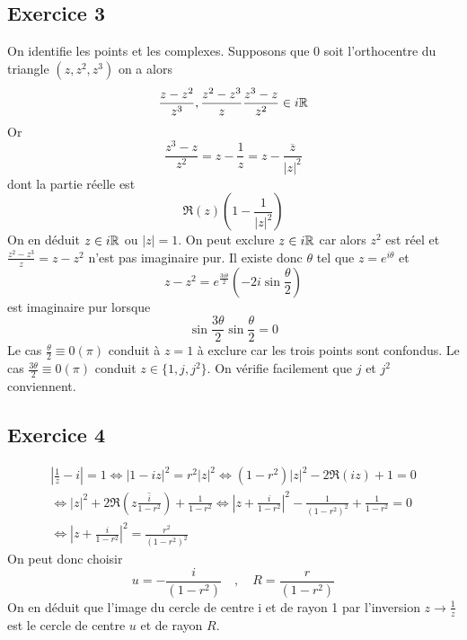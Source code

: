 \subsection*{Exercice 3} On identifie les points et les complexes. Supposons que $0$ soit l'orthocentre du triangle $(z,z^{2},z^{3})$ on a alors
\begin{displaymath}
\frac{z-z^{2}}{z^{3}},\frac{z^{2}-z^{3}}{z}\frac{z^{3}-z}{z^{2}}\in i\mathbb{R}
\end{displaymath}
Or
\begin{displaymath}
\frac{z^{3}-z}{z^{2}}=z-\frac{1}{z}=z-\frac{\overline{z}}{|z|^{2}}
\end{displaymath}
dont la partie réelle est
\begin{displaymath}
\Re(z)(1-\frac{1}{|z|^{2}})
\end{displaymath}
On en déduit $z\in i\mathbb{R}$ ou $|z|=1$.\newline
On peut exclure $z\in i\mathbb{R}$ car alors $z^{2}$ est réel et $\frac{z^{2}-z^{3}}{z}=z-z^{2}$ n'est pas imaginaire pur. Il existe donc $\theta$ tel que $z=e^{i\theta}$ et
\begin{displaymath} 
z-z^{2}=e^{\frac{3i\theta}{2}}(-2i\sin\frac{\theta}{2})
\end{displaymath}
est imaginaire pur lorsque
\begin{displaymath}
\sin\frac{3\theta}{2}\sin\frac{\theta}{2}=0
\end{displaymath}
Le cas $\frac{\theta}{2}\equiv 0 (\pi)$ conduit {\`a} $z=1$ {\`a} exclure car les trois points sont confondus. Le cas $\frac{3\theta}{2}\equiv 0 (\pi)$ conduit $z\in\{1,j,j^{2}\}$. On vérifie facilement que $j$ et $j^{2}$ conviennent.

\subsection*{Exercice 4}
\begin{multline*}
|\frac{1}{z}-i|=1 \Leftrightarrow |1-iz|^2=r^2|z|^2
 \Leftrightarrow (1-r^2)|z|^2-2\Re (iz)+1=0\\
 \Leftrightarrow |z|^2+2\Re(z\overline{\frac{i}{1-r^2}})+\frac{1}{1-r^2}
 \Leftrightarrow |z+\frac{i}{1-r^2}|^2-\frac{1}{(1-r^2)^2}+\frac{1}{1-r^2}=0\\
 \Leftrightarrow  |z+\frac{i}{1-r^2}|^2=\frac{r^2}{(1-r^2)^2}
\end{multline*}
On peut donc choisir
\begin{displaymath}
u=-\frac{i}{(1-r^2)}\quad,\quad R=\frac{r}{(1-r^2)}
\end{displaymath}
On en déduit que l'image du cercle de centre i et de rayon 1 par l'inversion $z\rightarrow\frac{1}{z}$ est le cercle de centre $u$
et de rayon $R$.
